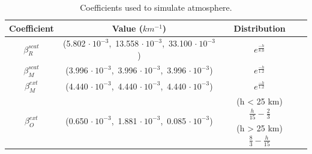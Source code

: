 \documentclass{ctuthesis}
\begin{document}
\begin{center}
\begin{table}[h]
\begin{tabular}{ ||c|c|c|c|| } 
\hline
Coefficient & Value ($km^{-1}$) & Distribution \\
\hline
\hline
$\beta^{scat}_{R}$ & (5.802 $\cdot\ 10^{-3}$,\ 13.558 $\cdot\ 10^{-3}$,\ 33.100 $\cdot\ 10^{-3}$) & $e^{\frac{-h}{8.0}}$ \\
\hline                                                                          
$\beta^{scat}_{M}$ & (3.996 $\cdot\ 10^{-3}$,\ 3.996  $\cdot\ 10^{-3}$,\ 3.996  $\cdot\ 10^{-3}$) & $e^{\frac{-h}{1.2}}$ \\
\hline                                                                          
$\beta^{ext}_{M}$ & (4.440  $\cdot\ 10^{-3}$,\ 4.440  $\cdot\ 10^{-3}$,\ 4.440  $\cdot\ 10^{-3}$) & $e^{\frac{-h}{1.2}}$ \\
\hline
\multirow{2}{*}{$\beta^{ext}_{O}$} & \multirow{2}{*}{(0.650 $\cdot\ 10^{-3}$,\ 1.881 $\cdot\ 10^{-3}$,\ 0.085 $\cdot\ 10^{-3}$)} & (h < 25 km) $\frac{h}{15} - \frac{2}{3}$ \\
& & (h > 25 km) $\frac{8}{3}-\frac{h}{15}$ \\
\hline
\end{tabular}
\caption[Earth-like coefficients]{\label{tab:Earth Coeff} Coefficients used to simulate atmosphere.}
\end{table}
\end{center}
\end{document}
